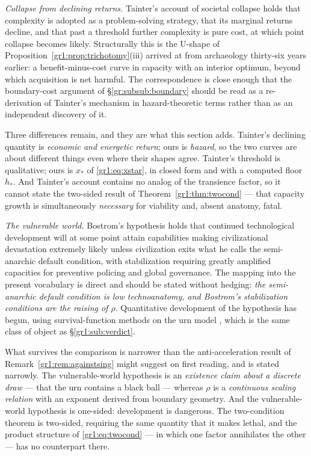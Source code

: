\documentclass[11pt]{article}
\numberwithin{equation}{section}
\theoremstyle{plain}
\theoremstyle{definition}
\theoremstyle{remark}
\begin{document}
\emph{Collapse from declining returns.} Tainter's account of societal
collapse \cite{Tainter88} holds that complexity is adopted as a
problem-solving strategy, that its marginal returns decline, and that
past a threshold further complexity is pure cost, at which point
collapse becomes likely. Structurally this is the U-shape of
Proposition~\ref{gr1:prop:trichotomy}(iii) arrived at from archaeology
thirty-six years earlier: a benefit-minus-cost curve in capacity with an
interior optimum, beyond which acquisition is net harmful. The
correspondence is close enough that the boundary-cost argument of
\S\ref{gr:subsub:boundary} should be read as a re-derivation of
Tainter's mechanism in hazard-theoretic terms rather than as an
independent discovery of it.

Three differences remain, and they are what this section adds. Tainter's
declining quantity is \emph{economic and energetic return}; ours is
\emph{hazard}, so the two curves are about different things even where
their shapes agree. Tainter's threshold is qualitative; ours is
$x_\ast$ of \eqref{gr1:eq:xstar}, in closed form and with a computed
floor $h_\ast$. And Tainter's account contains no analog of the
transience factor, so it cannot state the two-sided result of
Theorem~\ref{gr1:thm:twocond} --- that capacity growth is simultaneously
\emph{necessary} for viability and, absent anatomy, fatal.

\emph{The vulnerable world.} Bostrom's hypothesis \cite{Bostrom19} holds
that continued technological development will at some point attain
capabilities making civilizational devastation extremely likely unless
civilization exits what he calls the semi-anarchic default condition,
with stabilization requiring greatly amplified capacities for preventive
policing and global governance. The mapping into the present vocabulary
is direct and should be stated without hedging: \emph{the semi-anarchic
default condition is low technoanatomy, and Bostrom's stabilization
conditions are the raising of $\rho$}. Quantitative development of the
hypothesis has begun, using survival-function methods on the urn model
\cite{EF24}, which is the same class of object as
\S\ref{gr1:sub:verdict}.

What survives the comparison is narrower than the anti-acceleration
result of Remark~\ref{gr1:rem:againstsing} might suggest on first
reading, and is stated narrowly. The vulnerable-world hypothesis is an
\emph{existence claim about a discrete draw} --- that the urn contains a
black ball --- whereas $\rho$ is a \emph{continuous scaling relation}
with an exponent derived from boundary geometry. And the vulnerable-world
hypothesis is one-sided: development is dangerous. The two-condition
theorem is two-sided, requiring the same quantity that it makes lethal,
and the product structure of \eqref{gr1:eq:twocond} --- in which one
factor annihilates the other --- has no counterpart there.
\end{document}
